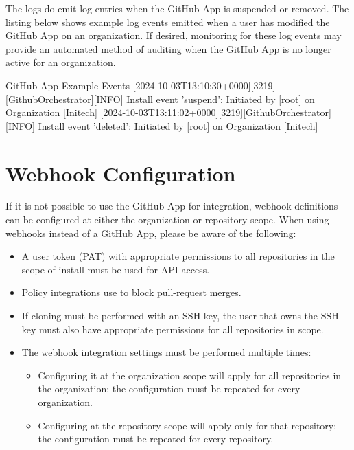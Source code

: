 The \cxoneflow logs do emit log entries when the GitHub App is suspended or removed. The listing below shows example log events
emitted when a user has modified the GitHub App on an organization.  If desired, monitoring for these log events may provide
an automated method of auditing when the GitHub App is no longer active for an organization.

\begin{code}{GitHub App Example Events}{}{}
[2024-10-03T13:10:30+0000][3219][GithubOrchestrator][INFO] Install event 'suspend': Initiated by [root] on Organization [Initech]
[2024-10-03T13:11:02+0000][3219][GithubOrchestrator][INFO] Install event 'deleted': Initiated by [root] on Organization [Initech]
\end{code}

\section{Webhook Configuration}

If it is not possible to use the GitHub App for \cxoneflow integration, webhook definitions can be configured at either the
organization or repository scope.  When using webhooks instead of a GitHub App, please be aware of the following:

\begin{itemize}
    \item A user token (PAT) with appropriate permissions to all repositories in the scope of install must be used for API access.
    \item Policy integrations use 
    to block pull-request merges.  
    \item If cloning must be performed with an SSH key, the user that owns the SSH key must also have appropriate permissions for
    all repositories in scope.
    \item The webhook integration settings must be performed multiple times:
    \begin{itemize}
        \item Configuring it at the organization scope will apply for all repositories in the organization; the configuration must be repeated for
        every organization.
        \item Configuring at the repository scope will apply only for that repository; the configuration must be repeated for every
        repository.
    \end{itemize}
\end{itemize}

